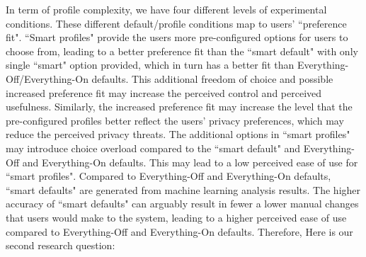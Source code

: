 %
%

In term of profile complexity, we have four different levels of experimental conditions. These different default/profile conditions map to users' ``preference fit". ``Smart profiles" provide the users more pre-configured options for users to choose from, leading to a better preference fit than the ``smart default" with only single ``smart" option provided, which in turn has a better fit than Everything-Off/Everything-On defaults. This additional freedom of choice and possible increased preference fit may increase the perceived control and perceived usefulness. Similarly, the increased preference fit may increase the level that the pre-configured profiles better reflect the users' privacy preferences, which may reduce the perceived privacy threats. The additional options in ``smart profiles" may introduce choice overload compared to the ``smart default" and Everything-Off and Everything-On defaults. This may lead to a low perceived ease of use for ``smart profiles". Compared to Everything-Off and Everything-On defaults, ``smart defaults" are generated from machine learning analysis results. The higher accuracy of ``smart defaults" can arguably result in fewer a lower manual changes that users would make to the system, leading to a higher perceived ease of use compared to Everything-Off and Everything-On defaults. Therefore, Here is our second research question:

